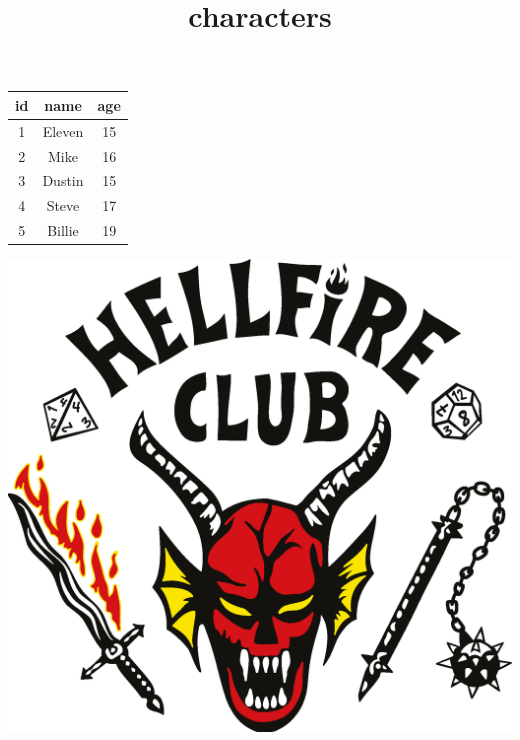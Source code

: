 \documentclass{article}
\title{characters}
\begin{document}
\begin{table}[h!]
\begin{tabular}{|c|c|c|}
\hline
id&name&age\\ \hline
1&Eleven&15\\ \hline
2&Mike&16\\ \hline
3&Dustin&15\\ \hline
4&Steve&17\\ \hline
5&Billie&19\\ \hline
\end{tabular}
\end{table}

\includegraphics[width=1\textwidth]{logo.png}
\end{document}
